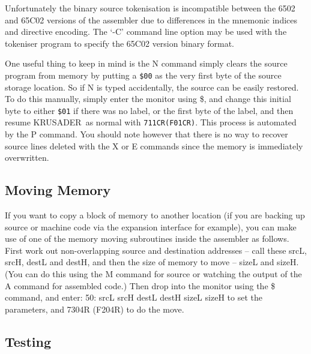 \documentclass[12pt]{article}
\newcommand{\replica}[1]{\textsf{#1}}
\newcommand{\krusader}{\textsf{KRUSADER}}
\begin{document}
Unfortunately the binary source tokenisation is incompatible between the 6502 and 65C02 versions 
of the assembler due to differences in the mnemonic indices and directive encoding. The `-C' command line option 
may be used with the tokeniser program to specify the 65C02 version binary format.

One useful thing to keep in mind is the \replica{N} command simply clears the source program
from memory by putting a \texttt{\$00} as the very first byte of the source storage location.
So if \replica{N} is typed accidentally, the source can be easily restored.  To do this manually, simply enter
the monitor using \replica{\$}, and change this initial byte to either \texttt{\$01} if there was no
label, or the first byte of the label, and then resume \krusader\ as normal with \texttt{711CR(F01CR)}.
This process is automated by the \replica{P} command.
You should note however that there is no way to recover source lines deleted with the
\replica{X} or \replica{E} commands since the memory is immediately overwritten.

\subsection{Moving Memory}

If you want to copy a block of memory to another location (if you are backing up source 
or machine code via the expansion interface for example), you can make use of one
of the memory moving subroutines inside the assembler as follows.  First work out non-overlapping source
and destination addresses -- call these \replica{srcL, srcH, destL} and \replica{destH}, and then
the size of memory to move -- \replica{sizeL} and \replica{sizeH}.  
(You can do this using the \replica{M} command for 
source or watching the output of the \replica{A} command for assembled code.)  Then drop into the 
monitor using the \replica{\$} command, and enter:
\replica{50: srcL srcH destL destH sizeL sizeH}
to set the parameters, and \replica{7304R} (\replica{F204R}) to do the move.

\subsection{Testing}
\end{document}
